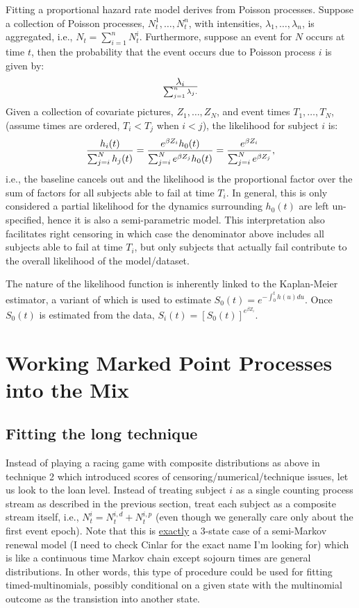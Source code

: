 \documentclass[10pt]{article}
\begin{document}
Fitting a proportional hazard rate model derives from Poisson processes.  Suppose a collection of Poisson processes, $N^1_t, \ldots, N^n_t$, with intensities,
$\lambda_1, \ldots, \lambda_n$, is aggregated, i.e., $N_t=\sum_{i=1}^n N^i_t$.  Furthermore, suppose an event for $N$ occurs at time $t$, then the probability
that the event occurs due to Poisson process $i$ is given by:
$$\lambda_i \over \sum_{j=1}^n \lambda_j.$$
Given a collection of covariate pictures, $Z_1, \ldots, Z_N$, and event times $T_1, \ldots, T_N$, (assume times are ordered, $T_i<T_j$ when $i<j$), 
the likelihood for subject $i$ is:
$$ { h_i(t) \over \sum_{j=i}^N h_j(t) } = {e^{\beta Z_i}h_0(t) \over \sum_{j=i}^N e^{\beta Z_j}h_0(t)}= {e^{\beta Z_i} \over \sum_{j=i}^N e^{\beta Z_j}},$$
i.e., the baseline cancels out and the likelihood is the proportional factor over the sum of factors for all subjects able to fail at time $T_i$.
In general, this is only considered a partial likelihood for the dynamics surrounding $h_0(t)$ are left un-specified, hence it is also a semi-parametric model.
This interpretation also facilitates right censoring in which case the denominator above includes all subjects able to fail at time $T_i$, but only
subjects that actually fail contribute to the overall likelihood of the model/dataset.
 
The nature of the likelihood function is inherently linked to the Kaplan-Meier estimator, a variant of which is used to estimate $S_0(t)=e^{-\int_0^th(u)du}$. 
Once $S_0(t)$ is estimated from the data, $S_i(t)=[S_0(t)]^{e^{\beta Z_i}}$.

\section{Working Marked Point Processes into the Mix}

\subsection{Fitting the long technique}

Instead of playing a racing game with composite distributions as above in technique 2 which introduced scores of censoring/numerical/technique issues, let us 
look to the loan level.  Instead of treating subject $i$ as a single counting process stream as described in the previous section, treat each subject as a 
composite stream itself, i.e., $N^i_t=N^{i,d}_t+N^{i,p}_t$ (even though we generally care only about the first event epoch).
Note that 
this is \underline{exactly} a 3-state case of a semi-Markov renewal model (I need to check Cinlar for the exact name I'm looking for) which is like a continuous 
time Markov chain except sojourn times are general distributions.  In other words, this type of procedure could be used for fitting timed-multinomials, 
possibly conditional on a given state with the multinomial outcome as the transistion into another state.
\end{document}
